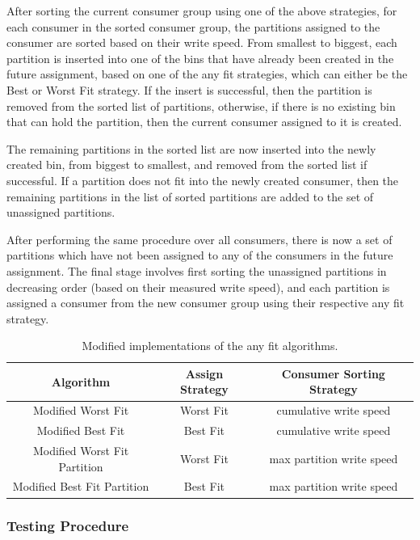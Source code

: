 After sorting the current consumer group using one of the above strategies, for
each consumer in the sorted consumer group, the partitions assigned to the
consumer are sorted based on their write speed. From smallest to biggest, each
partition is inserted into one of the bins that have already been created in the
future assignment, based on one of the any fit strategies, which can either be
the Best or Worst Fit strategy. If the insert is successful, then the partition
is removed from the sorted list of partitions, otherwise, if there is no
existing bin that can hold the partition, then the current consumer assigned to
it is created. 

The remaining partitions in the sorted list are now inserted into the newly
created bin, from biggest to smallest, and removed from the sorted list if
successful. If a partition does not fit into the newly created consumer, then
the remaining partitions in the list of sorted partitions are added to the set
of unassigned partitions.

After performing the same procedure over all consumers, there is now a set of
partitions which have not been assigned to any of the consumers in the future
assignment. The final stage involves first sorting the unassigned partitions in
decreasing order (based on their measured write speed), and each partition is
assigned a consumer from the new consumer group using their respective any fit
strategy.

\begin{table}[H] 
\centering 
\caption{Modified implementations of the any fit algorithms.} 
\begin{tabular}{ |c|c|c| } 
    \hline 
    \textbf{Algorithm} & \textbf{Assign Strategy} & \textbf{Consumer Sorting Strategy} \\ 
    \hline
    Modified Worst Fit & Worst Fit & cumulative write speed \\ 
    Modified Best Fit & Best Fit & cumulative write speed \\ 
    Modified Worst Fit Partition & Worst Fit & max partition write speed \\ 
    Modified Best Fit Partition &  Best Fit & max partition write speed \\
    \hline
\end{tabular} 
\end{table}


\subsubsection{Testing Procedure} \label{c3subsub:testing}

